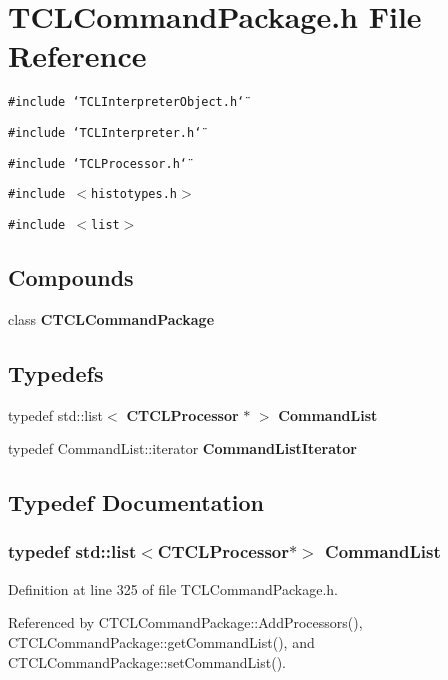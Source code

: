 \section{TCLCommand\-Package.h File Reference}
\label{TCLCommandPackage_8h}
{\tt \#include \char`\"{}TCLInterpreter\-Object.h\char`\"{}}\par
{\tt \#include \char`\"{}TCLInterpreter.h\char`\"{}}\par
{\tt \#include \char`\"{}TCLProcessor.h\char`\"{}}\par
{\tt \#include $<$histotypes.h$>$}\par
{\tt \#include $<$list$>$}\par
\subsection*{Compounds}
\begin{CompactItemize}
\item 
class {\bf CTCLCommand\-Package}
\end{CompactItemize}
\subsection*{Typedefs}
\begin{CompactItemize}
\item 
typedef std::list$<$ {\bf CTCLProcessor} $\ast$ $>$ {\bf Command\-List}
\item 
typedef Command\-List::iterator {\bf Command\-List\-Iterator}
\end{CompactItemize}


\subsection{Typedef Documentation}
\subsubsection{\setlength{\rightskip}{0pt plus 5cm}typedef std::list$<${\bf CTCLProcessor}$\ast$$>$ Command\-List}\label{TCLCommandPackage_8h_a0}




Definition at line 325 of file TCLCommand\-Package.h.

Referenced by CTCLCommand\-Package::Add\-Processors(), CTCLCommand\-Package::get\-Command\-List(), and CTCLCommand\-Package::set\-Command\-List().
